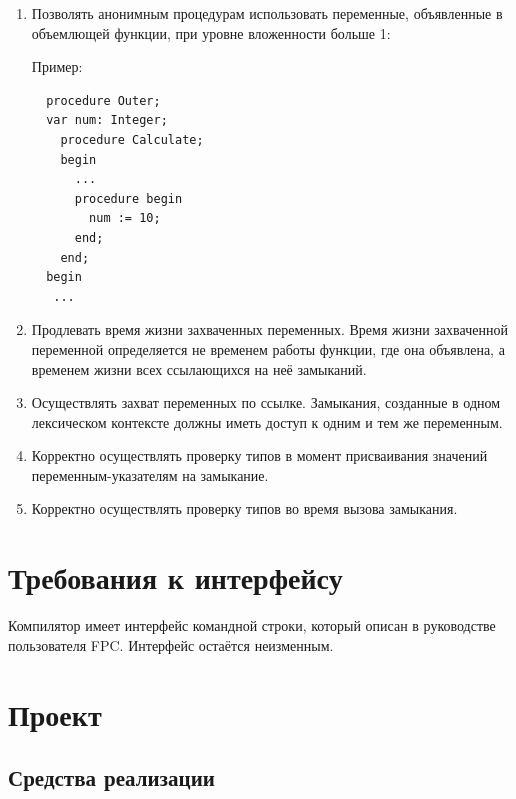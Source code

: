 \documentclass{imcs}
\begin{document}
\begin{enumerate}
    \item Позволять анонимным процедурам использовать переменные, объявленные в объемлющей функции, при уровне вложенности больше 1:

Пример:
\begin{lstlisting}
  procedure Outer;
  var num: Integer;
    procedure Calculate;
    begin
      ...
      procedure begin
        num := 10;
      end;
    end;
  begin
   ...
\end{lstlisting}

    \item Продлевать время жизни захваченных переменных. Время жизни захваченной переменной определяется не временем работы функции, где она объявлена, а временем жизни всех ссылающихся на неё замыканий.

    \item Осуществлять захват переменных по ссылке. Замыкания, созданные в одном лексическом контексте должны иметь доступ к одним и тем же переменным.
      
    \item Корректно осуществлять проверку типов в момент присваивания значений переменным-указателям на замыкание.

    \item Корректно осуществлять проверку типов во время вызова замыкания.
      
\end{enumerate}


\section{Требования к интерфейсу}

Компилятор имеет интерфейс командной строки, который описан
в руководстве пользователя FPC\cite{userguide}. Интерфейс остаётся неизменным.

\section{Проект}

\subsection{Средства реализации}

\end{document}
